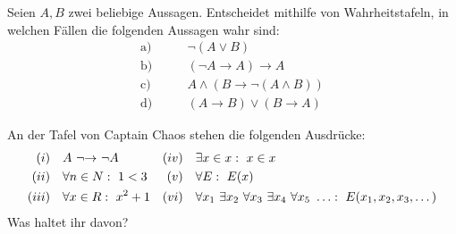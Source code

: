 	
\begin{aufg}[Wahrheitstafeln (L)] \label{aufg:wtafeln}
    Seien $A,B$ zwei beliebige Aussagen. Entscheidet mithilfe von Wahrheitstafeln, in welchen Fällen die folgenden Aussagen wahr sind:
    \begin{align*}
        \text{a)}&\qquad \neg(A\lor B) \\
        \text{b)}&\qquad (\neg A \to A) \to A \tag{Consequentia mirabilis} \\
        \text{c)}&\qquad A\land(B\to\neg(A\land B)) \\
        \text{d)}&\qquad (A\to B)\lor(B\to A) \tag{Linearitätsaxiom}
    \end{align*}
\end{aufg}


\begin{aufg}[freestyle]
    An der Tafel von Captain Chaos stehen die folgenden Ausdrücke:
    \begin{align*}
        (i)\quad& A\ {\neg}{\to}\ \neg A&(iv)\quad& \exists x\in x:\ x\in x  \\
        (ii)\quad&   \forall n\in \N:\ 1<3 & (v)\quad& \forall E :\ E(x) \\
        (iii)\quad& \forall x\in \R :\ x^2+1 &(vi)\quad& \forall x_1\ \exists x_2\ \forall x_3\ \exists x_4\ \forall x_5\ \ldots:\ E(x_1,x_2,x_3,\dots)
    \end{align*}
    Was haltet ihr davon?
\end{aufg}

